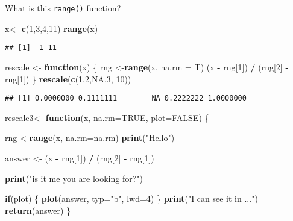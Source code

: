 \documentclass[
]{article}
\newenvironment{Shaded}{\begin{snugshade}}{\end{snugshade}}
\newcommand{\ControlFlowTok}[1]{\textcolor[rgb]{0.13,0.29,0.53}{\textbf{#1}}}
\newcommand{\DataTypeTok}[1]{\textcolor[rgb]{0.13,0.29,0.53}{#1}}
\newcommand{\DecValTok}[1]{\textcolor[rgb]{0.00,0.00,0.81}{#1}}
\newcommand{\KeywordTok}[1]{\textcolor[rgb]{0.13,0.29,0.53}{\textbf{#1}}}
\newcommand{\NormalTok}[1]{#1}
\newcommand{\OperatorTok}[1]{\textcolor[rgb]{0.81,0.36,0.00}{\textbf{#1}}}
\newcommand{\OtherTok}[1]{\textcolor[rgb]{0.56,0.35,0.01}{#1}}
\newcommand{\StringTok}[1]{\textcolor[rgb]{0.31,0.60,0.02}{#1}}
\begin{document}
What is this \texttt{range()} function?

\begin{Shaded}
\begin{Highlighting}[]
\NormalTok{x<-}\StringTok{ }\KeywordTok{c}\NormalTok{(}\DecValTok{1}\NormalTok{,}\DecValTok{3}\NormalTok{,}\DecValTok{4}\NormalTok{,}\DecValTok{11}\NormalTok{)}
\KeywordTok{range}\NormalTok{(x)}
\end{Highlighting}
\end{Shaded}

\begin{verbatim}
## [1]  1 11
\end{verbatim}

\begin{Shaded}
\begin{Highlighting}[]
\NormalTok{rescale <-}\StringTok{ }\ControlFlowTok{function}\NormalTok{(x) \{}
\NormalTok{ rng <-}\KeywordTok{range}\NormalTok{(x, }\DataTypeTok{na.rm =}\NormalTok{ T)}
\NormalTok{ (x }\OperatorTok{-}\StringTok{ }\NormalTok{rng[}\DecValTok{1}\NormalTok{]) }\OperatorTok{/}\StringTok{ }\NormalTok{(rng[}\DecValTok{2}\NormalTok{] }\OperatorTok{-}\StringTok{ }\NormalTok{rng[}\DecValTok{1}\NormalTok{])}
\NormalTok{\}}
\KeywordTok{rescale}\NormalTok{(}\KeywordTok{c}\NormalTok{(}\DecValTok{1}\NormalTok{,}\DecValTok{2}\NormalTok{,}\OtherTok{NA}\NormalTok{,}\DecValTok{3}\NormalTok{, }\DecValTok{10}\NormalTok{))}
\end{Highlighting}
\end{Shaded}

\begin{verbatim}
## [1] 0.0000000 0.1111111        NA 0.2222222 1.0000000
\end{verbatim}

\begin{Shaded}
\begin{Highlighting}[]
\NormalTok{rescale3<-}\StringTok{ }\ControlFlowTok{function}\NormalTok{(x, }\DataTypeTok{na.rm=}\OtherTok{TRUE}\NormalTok{, }\DataTypeTok{plot=}\OtherTok{FALSE}\NormalTok{) \{}
  
\NormalTok{ rng <-}\KeywordTok{range}\NormalTok{(x, }\DataTypeTok{na.rm=}\NormalTok{na.rm)}
 \KeywordTok{print}\NormalTok{(}\StringTok{"Hello"}\NormalTok{)}
 
\NormalTok{ answer <-}\StringTok{ }\NormalTok{(x }\OperatorTok{-}\StringTok{ }\NormalTok{rng[}\DecValTok{1}\NormalTok{]) }\OperatorTok{/}\StringTok{ }\NormalTok{(rng[}\DecValTok{2}\NormalTok{] }\OperatorTok{-}\StringTok{ }\NormalTok{rng[}\DecValTok{1}\NormalTok{])}
 
 \KeywordTok{print}\NormalTok{(}\StringTok{"is it me you are looking for?"}\NormalTok{)}
 
 \ControlFlowTok{if}\NormalTok{(plot) \{}
 \KeywordTok{plot}\NormalTok{(answer, }\DataTypeTok{typ=}\StringTok{"b"}\NormalTok{, }\DataTypeTok{lwd=}\DecValTok{4}\NormalTok{)}
\NormalTok{ \}}
 \KeywordTok{print}\NormalTok{(}\StringTok{"I can see it in ..."}\NormalTok{)}
 \KeywordTok{return}\NormalTok{(answer)}
\NormalTok{\}}
\end{Highlighting}
\end{Shaded}
\end{document}
